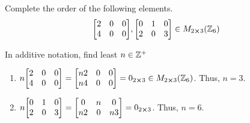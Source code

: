 \begin{exercise}
    Complete the order of the following elements.
    \[ \mqty[2 & 0 & 0 \\ 4 & 0 & 0], \mqty[0 & 1 & 0 \\ 2 & 0 & 3] \in M_{2 \cross 3} \qty(\Z_6) \]
\end{exercise}

\begin{solution}
    In additive notation, find least $n \in \mathbb{Z}^+$
    \begin{enumerate}
        \item $n \mqty[2 & 0 & 0 \\ 4 & 0 & 0] = \mqty[n2 & 0 & 0 \\ n4 & 0 & 0] = 0_{2 \cross 3} \in M_{2 \cross 3} \qty(\Z_6)$. Thus, $n = 3$.
        \item $n \mqty[0 & 1 & 0 \\ 2 & 0 & 3] = \mqty[0 & n & 0 \\ n2 & 0 & n3] = 0_{2 \cross 3}$. Thus, $n = 6$.
    \end{enumerate}
\end{solution}